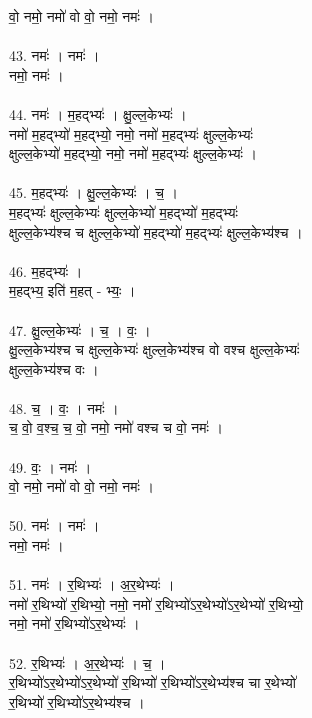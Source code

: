 वो॒ नमो॒ नमो॑ वो वो॒ नमो॒ नमः॑ ।\\
\\
43. नमः॑ । नमः॑ ।\\
नमो॒ नमः॑ ।\\
\\
44. नमः॑ । म॒हद्भ्यः॑ । क्षु॒ल्ल॒केभ्यः॑ ।\\
नमो॑ म॒हद्भ्यो॑ म॒हद्भ्यो॒ नमो॒ नमो॑ म॒हद्भ्यः॑ क्षुल्ल॒केभ्यः॑\\
क्षुल्ल॒केभ्यो॑ म॒हद्भ्यो॒ नमो॒ नमो॑ म॒हद्भ्यः॑ क्षुल्ल॒केभ्यः॑ ।\\
\\
45. म॒हद्भ्यः॑ । क्षु॒ल्ल॒केभ्यः॑ । च॒ ।\\
म॒हद्भ्यः॑ क्षुल्ल॒केभ्यः॑ क्षुल्ल॒केभ्यो॑ म॒हद्भ्यो॑ म॒हद्भ्यः॑\\
क्षुल्ल॒केभ्य॑श्च च क्षुल्ल॒केभ्यो॑ म॒हद्भ्यो॑ म॒हद्भ्यः॑ क्षुल्ल॒केभ्य॑श्च ।\\
\\
46. म॒हद्भ्यः॑ ।\\
म॒हद्भ्य॒ इति॑ म॒हत् - भ्यः॒ ।\\
\\
47. क्षु॒ल्ल॒केभ्यः॑ । च॒ । वः॒ ।\\
क्षु॒ल्ल॒केभ्य॑श्च च क्षुल्ल॒केभ्यः॑ क्षुल्ल॒केभ्य॑श्च वो वश्च क्षुल्ल॒केभ्यः॑\\
क्षुल्ल॒केभ्य॑श्च वः ।\\
\\
48. च॒ । वः॒ । नमः॑ ।\\
च॒ वो॒ व॒श्च॒ च॒ वो॒ नमो॒ नमो॑ वश्च च वो॒ नमः॑ ।\\
\\
49. वः॒ । नमः॑ ।\\
वो॒ नमो॒ नमो॑ वो वो॒ नमो॒ नमः॑ ।\\
\\
50. नमः॑ । नमः॑ ।\\
नमो॒ नमः॑ ।\\
\\
51. नमः॑ । र॒थिभ्यः॑ । अ॒र॒थेभ्यः॑ ।\\
नमो॑ र॒थिभ्यो॑ र॒थिभ्यो॒ नमो॒ नमो॑ र॒थिभ्यो॑ऽर॒थेभ्यो॑ऽर॒थेभ्यो॑ र॒थिभ्यो॒\\
नमो॒ नमो॑ र॒थिभ्यो॑ऽर॒थेभ्यः॑ ।\\
\\
52. र॒थिभ्यः॑ । अ॒र॒थेभ्यः॑ । च॒ ।\\
र॒थिभ्यो॑ऽर॒थेभ्यो॑ऽर॒थेभ्यो॑ र॒थिभ्यो॑ र॒थिभ्यो॑ऽर॒थेभ्य॑श्च चा र॒थेभ्यो॑\\
र॒थिभ्यो॑ र॒थिभ्यो॑ऽर॒थेभ्य॑श्च ।\\
\\
